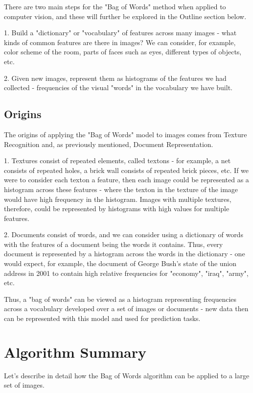 \documentclass{article}
\begin{document}
There are two main steps for the "Bag of Words" method when applied to computer vision, and these will further be explored in the Outline section below. 

1. Build a "dictionary" or "vocabulary" of features across many images - what kinds of common features are there in images? We can consider, for example, color scheme of the room, parts of faces such as eyes, different types of objects, etc.

2. Given new images, represent them as histograms of the features we had collected - frequencies of the visual "words" in the vocabulary we have built. 
\subsection{Origins}
The origins of applying the "Bag of Words" model to images comes from Texture Recognition and, as previously mentioned, Document Representation. 

1. Textures consist of repeated elements, called textons - for example, a net consists of repeated holes, a brick wall consists of repeated brick pieces, etc. If we were to consider each texton a feature, then each image could be represented as a histogram across these features - where the texton in the texture of the image would have high frequency in the histogram. Images with multiple textures, therefore, could be represented by histograms with high values for multiple features.  

2. Documents consist of words, and we can consider using a dictionary of words with the features of a document being the words it contains. Thus, every document is represented by a histogram across the words in the dictionary - one would expect, for example, the document of George Bush's state of the union address in 2001 to contain high relative frequencies for "economy", "iraq", "army", etc. 

Thus, a "bag of words" can be viewed as a histogram representing frequencies across a vocabulary developed over a set of images or documents - new data then can be represented with this model and used for prediction tasks. 

\section{Algorithm Summary}
Let's describe in detail how the Bag of Words algorithm can be applied to a large set of images.
\end{document}
